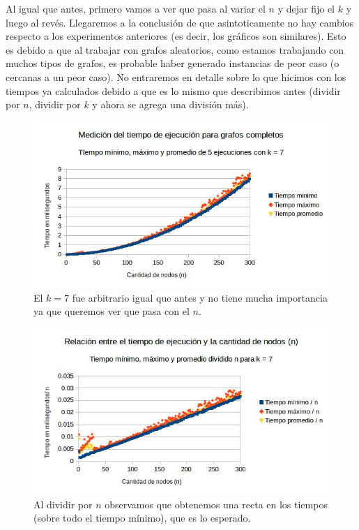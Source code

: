 \documentclass[a4paper]{article}
\begin{document}
\newline
\newline
Al igual que antes, primero vamos a ver que pasa al variar el $n$ y dejar fijo el $k$ y luego al revés. Llegaremos a la conclusión de que asintoticamente no hay cambios respecto a los experimentos anteriores (es decir, los gráficos son similares). Esto es debido a que al trabajar con grafos aleatorios, como estamos trabajando con muchos tipos de grafos, es probable haber generado instancias de peor caso (o cercanas a un peor caso).
\newline No entraremos en detalle sobre lo que hicimos con los tiempos ya calculados debido a que es lo mismo que describimos antes (dividir por $n$, dividir por $k$ y ahora se agrega una división más).
\begin{figure}[h!]
\centering
\includegraphics[scale=0.7]{graficostiempohgolosa/tiempocompletoskfijo.jpg}\caption{El $k = 7$ fue arbitrario igual que antes y no tiene mucha importancia ya que queremos ver que pasa con el $n$.}
\end{figure}

\begin{figure}[h!]
\centering
\includegraphics[scale=0.7]{graficostiempohgolosa/tiempocompletoskfijo2.jpg}\caption{Al dividir por $n$ observamos que obtenemos una recta en los tiempos (sobre todo el tiempo mínimo), que es lo esperado.}
\end{figure}
\end{document}
